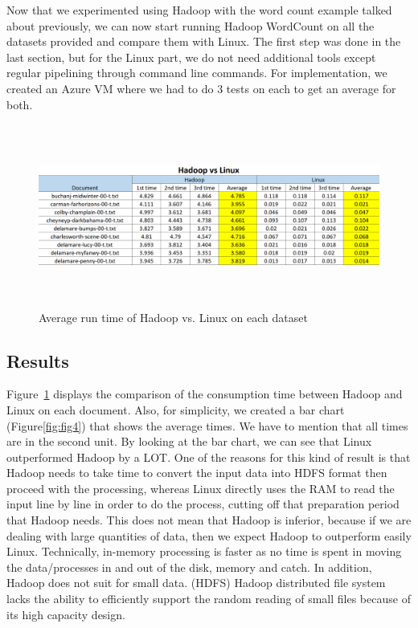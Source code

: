 \documentclass[12pt]{article}
\begin{document}
\noindent Now that we experimented using Hadoop with the word count example talked about previously, we can now start running Hadoop WordCount on all the datasets provided and compare them with Linux. The first step was done in the last section, but for the Linux part, we do not need additional tools except regular pipelining
through command line commands. For implementation, we created an Azure VM where we had to do 3 tests on each to get an average for both.

\begin{figure}[H]
    \centering
    \includegraphics[width=140mm, height=60mm, scale=1.0]{images/Hadoop_vs_Linux_table.PNG}
    \caption{Average run time of Hadoop vs. Linux on each dataset}
    \label{fig:fig3}
\end{figure}

\newpage

\subsection{Results}

\noindent Figure~\ref{fig:fig3} displays the comparison of the consumption time between Hadoop and Linux on each document. Also, for simplicity, we created a bar chart (Figure\ref{fig:fig4}) that shows the average times. We have to mention that all times are in the second unit. By looking at the bar chart, we can see that Linux outperformed Hadoop by a LOT. One of the reasons for this kind of result is that Hadoop needs to take time to convert the input data into HDFS format then proceed with the processing, whereas Linux directly uses the RAM to read the input line by line in order to do the process, cutting off that preparation period that Hadoop needs. This does not mean that Hadoop is inferior, because if we are dealing with large quantities of data, then we expect Hadoop to outperform easily Linux. Technically, in-memory processing is faster as no time is spent in moving the data/processes in and out of the disk, memory and catch. In addition, Hadoop does not suit for small data. (HDFS) Hadoop distributed file system lacks the ability to efficiently support the random reading of small files because of its high capacity design.
\end{document}
